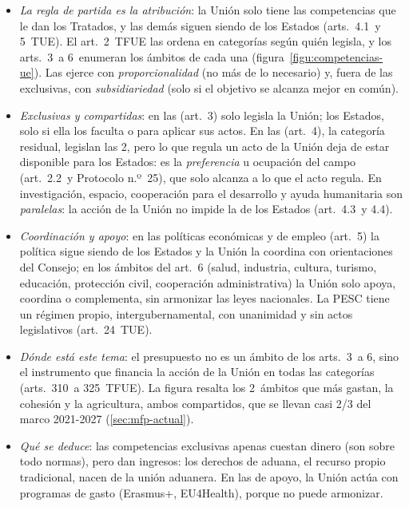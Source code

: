 \documentclass[11pt]{article}
\begin{document}
\begin{itemize}
\item \emph{La regla de partida es la atribución}: la Unión solo tiene las competencias que le dan los Tratados, y las demás siguen siendo de los Estados (arts.~4.1~y 5~TUE). El art.~2~TFUE las ordena en categorías según quién legisla, y los arts.~3~a 6~enumeran los ámbitos de cada una (figura~\ref{figu:competencias-ue}). Las ejerce con \emph{proporcionalidad} (no más de lo necesario) y, fuera de las exclusivas, con \emph{subsidiariedad} (solo si el objetivo se alcanza mejor en común).
\item \emph{Exclusivas y compartidas}: en las  (art.~3) solo legisla la Unión; los Estados, solo si ella los faculta o para aplicar sus actos. En las  (art.~4), la categoría residual, legislan las 2, pero lo que regula un acto de la Unión deja de estar disponible para los Estados: es la \emph{preferencia} u ocupación del campo (art.~2.2~y Protocolo n.º~25), que solo alcanza a lo que el acto regula. En investigación, espacio, cooperación para el desarrollo y ayuda humanitaria son \emph{paralelas}: la acción de la Unión no impide la de los Estados (art.~4.3~y 4.4).
\item \emph{Coordinación y apoyo}: en las políticas económicas y de empleo (art.~5) la política sigue siendo de los Estados y la Unión la coordina con orientaciones del Consejo; en los ámbitos del art.~6 (salud, industria, cultura, turismo, educación, protección civil, cooperación administrativa) la Unión solo apoya, coordina o complementa, sin armonizar las leyes nacionales. La PESC tiene un régimen propio, intergubernamental, con unanimidad y sin actos legislativos (art.~24~TUE).
\item \emph{Dónde está este tema}: el presupuesto no es un ámbito de los arts.~3~a 6, sino el instrumento que financia la acción de la Unión en todas las categorías (arts.~310~a 325~TFUE). La figura resalta los 2~ámbitos que más gastan, la cohesión y la agricultura, ambos compartidos, que se llevan casi 2/3 del marco 2021-2027 (\ref{sec:mfp-actual}).
\item \emph{Qué se deduce}: las competencias exclusivas apenas cuestan dinero (son sobre todo normas), pero dan ingresos: los derechos de aduana, el recurso propio tradicional, nacen de la unión aduanera. En las de apoyo, la Unión actúa con programas de gasto (Erasmus+, EU4Health), porque no puede armonizar.
\end{itemize}
\end{document}
